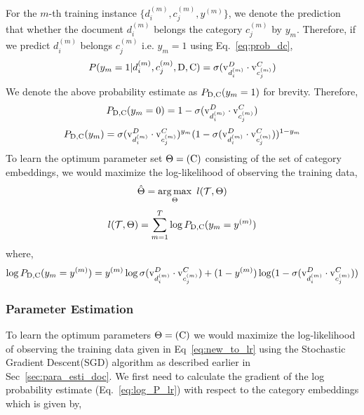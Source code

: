For the $m$-th training instance $\{ d^{(m)}_{i}, c^{(m)}_{j}, y^{(m)}\}$, we denote the prediction that whether the document $d^{(m)}_{i}$ belongs the category $c^{(m)}_{j}$ by $y_{m}$. Therefore, if we predict $d^{(m)}_{i}$ belongs $c^{(m)}_{j}$ i.e. $y_{m} = 1$ using Eq.~\ref{eq:prob_dc},
\begin{equation}
\label{eq:prob_trm}
P(y_{m}=1|d^{(m)}_{i}, c^{(m)}_{j}, \mathrm{D}, \mathrm{C}) = \sigma(\mathrm{v}^{D}_{d^{(m)}_{i}}\cdot \mathrm{v}^{C}_{c^{(m)}_{j}})
\end{equation}
We denote the above probability estimate as $P_{\mathrm{D}, \mathrm{C}}(y_{m} = 1)$ for brevity. Therefore,
\begin{equation}
\label{eq:prob_trm_neg}
P_{\mathrm{D}, \mathrm{C}}(y_{m} = 0) = 1 - \sigma(\mathrm{v}^{D}_{d^{(m)}_{i}}\cdot \mathrm{v}^{C}_{c^{(m)}_{j}})
\end{equation}
\begin{equation}
\label{eq:prob_bernouli}
P_{\mathrm{D}, \mathrm{C}}(y_{m}) = \sigma(\mathrm{v}^{D}_{d^{(m)}_{i}}\cdot \mathrm{v}^{C}_{c^{(m)}_{j}})^{y_{m}}(1 - \sigma(\mathrm{v}^{D}_{d^{(m)}_{i}}\cdot \mathrm{v}^{C}_{c^{(m)}_{j}}))^{1-y_{m}}
\end{equation}
To learn the optimum parameter set $\Theta = (\mathrm{C})$ consisting of the set of category embeddings, we would maximize the log-likelihood of observing the training data,
\begin{equation}
\label{eq:cembed_argmax}
\hat{\Theta} =  \operatorname*{arg\,max}_{\Theta}~l(\mathcal{T}, \Theta)
\end{equation}
\begin{equation}
\label{eq:new_to_lr}
l(\mathcal{T}, \Theta) = \sum_{m=1}^{T} \log P_{\mathrm{D}, \mathrm{C}}(y_{m} = y^{(m)})
\end{equation}
where,
\begin{equation}
\label{eq:log_P_lr}
\log P_{\mathrm{D}, \mathrm{C}}(y_{m} = y^{(m)}) = y^{(m)}\log \sigma(\mathrm{v}^{D}_{d^{(m)}_{i}}\cdot \mathrm{v}^{C}_{c^{(m)}_{j}}) + (1 - y^{(m)})\log (1 - \sigma(\mathrm{v}^{D}_{d^{(m)}_{i}}\cdot \mathrm{v}^{C}_{c^{(m)}_{j}}))
\end{equation}

\subsubsection{Parameter Estimation}
To learn the optimum parameters $\Theta=(\mathrm{C})$ we would maximize the log-likelihood of observing the training data given in Eq~\ref{eq:new_to_lr} using the Stochastic Gradient Descent(SGD) algorithm as described earlier in Sec~\ref{sec:para_esti_doc}. We first need to calculate the gradient of the log probability estimate (Eq.~\ref{eq:log_P_lr}) with respect to the category embeddings which is given by,


